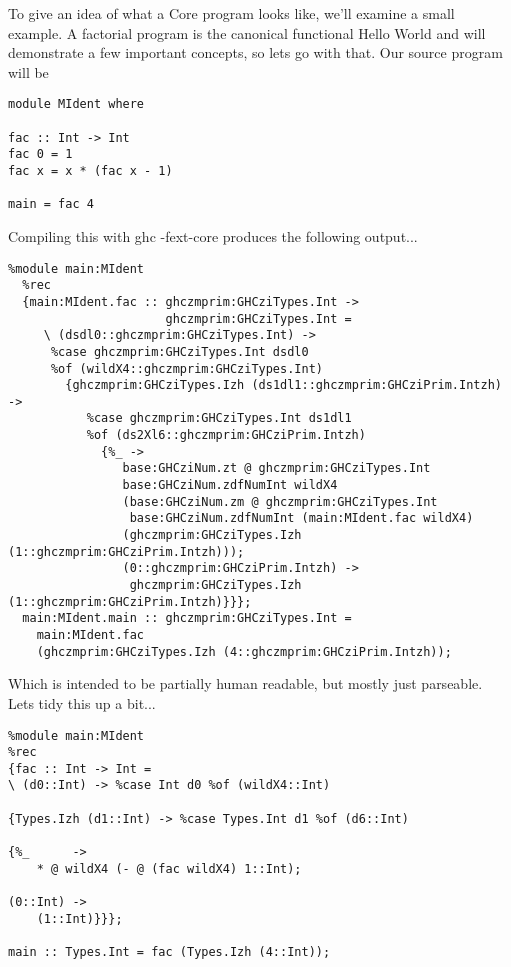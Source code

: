 \documentclass[11pt]{article}
\begin{document}
To give an idea of what a Core program looks like, we'll examine a small 
example. A factorial program is the canonical functional Hello World and will
demonstrate a few important concepts, so lets go with that. Our source program
will be 

\begin{verbatim}
module MIdent where

fac :: Int -> Int
fac 0 = 1
fac x = x * (fac x - 1)

main = fac 4
\end{verbatim}

\noindent Compiling this with ghc -fext-core produces the following output...

\begin{verbatim}
%module main:MIdent
  %rec
  {main:MIdent.fac :: ghczmprim:GHCziTypes.Int ->
                      ghczmprim:GHCziTypes.Int =
     \ (dsdl0::ghczmprim:GHCziTypes.Int) ->
      %case ghczmprim:GHCziTypes.Int dsdl0
      %of (wildX4::ghczmprim:GHCziTypes.Int)
        {ghczmprim:GHCziTypes.Izh (ds1dl1::ghczmprim:GHCziPrim.Intzh) ->
           %case ghczmprim:GHCziTypes.Int ds1dl1
           %of (ds2Xl6::ghczmprim:GHCziPrim.Intzh)
             {%_ ->
                base:GHCziNum.zt @ ghczmprim:GHCziTypes.Int 
                base:GHCziNum.zdfNumInt wildX4
                (base:GHCziNum.zm @ ghczmprim:GHCziTypes.Int
                 base:GHCziNum.zdfNumInt (main:MIdent.fac wildX4)
                (ghczmprim:GHCziTypes.Izh (1::ghczmprim:GHCziPrim.Intzh)));
                (0::ghczmprim:GHCziPrim.Intzh) ->
                 ghczmprim:GHCziTypes.Izh (1::ghczmprim:GHCziPrim.Intzh)}}};
  main:MIdent.main :: ghczmprim:GHCziTypes.Int =
    main:MIdent.fac
    (ghczmprim:GHCziTypes.Izh (4::ghczmprim:GHCziPrim.Intzh));
\end{verbatim}

\noindent Which is intended to be partially human readable, but mostly
just parseable. Lets tidy this up a bit...

\begin{verbatim}
%module main:MIdent
%rec
{fac :: Int -> Int =
\ (d0::Int) -> %case Int d0 %of (wildX4::Int)

{Types.Izh (d1::Int) -> %case Types.Int d1 %of (d6::Int)

{%_      ->
    * @ wildX4 (- @ (fac wildX4) 1::Int);

(0::Int) ->
    (1::Int)}}};

main :: Types.Int = fac (Types.Izh (4::Int));
\end{verbatim}
\end{document}

